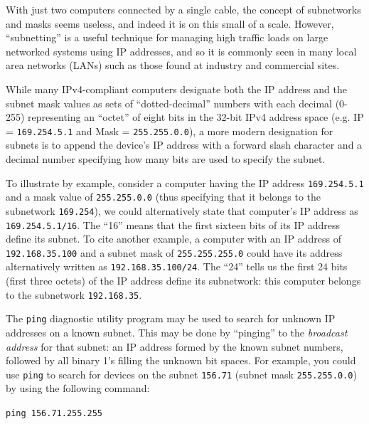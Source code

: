 With just two computers connected by a single cable, the concept of subnetworks and masks seems useless, and indeed it is on this small of a scale.  However, ``subnetting'' is a useful technique for managing high traffic loads on large networked systems using IP addresses, and so it is commonly seen in many local area networks (LANs) such as those found at industry and commercial sites. 

\vskip 10pt

While many IPv4-compliant computers designate both the IP address and the subnet mask values as sets of ``dotted-decimal'' numbers with each decimal (0-255) representing an ``octet'' of eight bits in the 32-bit IPv4 address space (e.g. IP = \texttt{169.254.5.1} and Mask = \texttt{255.255.0.0}), a more modern designation for subnets is to append the device's IP address with a forward slash character and a decimal number specifying how many bits are used to specify the subnet.  

To illustrate by example, consider a computer having the IP address \texttt{169.254.5.1} and a mask value of \texttt{255.255.0.0} (thus specifying that it belongs to the subnetwork \texttt{169.254}), we could alternatively state that computer's IP address as \texttt{169.254.5.1/16}.  The ``16'' means that the first sixteen bits of its IP address define its subnet.  To cite another example, a computer with an IP address of \texttt{192.168.35.100} and a subnet mask of \texttt{255.255.255.0} could have its address alternatively written as \texttt{192.168.35.100/24}.  The ``24'' tells us the first 24 bits (first three octets) of the IP address define its subnetwork: this computer belongs to the subnetwork \texttt{192.168.35}.

\vskip 10pt

\filbreak

The \texttt{ping} diagnostic utility program may be used to search for unknown IP addresses on a known subnet.  This may be done by ``pinging'' to the \textit{broadcast address} for that subnet: an IP address formed by the known subnet numbers, followed by all binary 1's filling the unknown bit spaces.  For example, you could use \texttt{ping} to search for devices on the subnet \texttt{156.71} (subnet mask \texttt{255.255.0.0}) by using the following command:  

\vskip 10pt

\texttt{ping 156.71.255.255}







